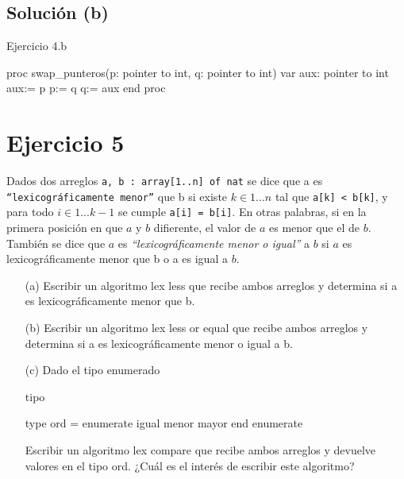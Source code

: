 \subsection{Solución (b)}
\begin{codebox}{Ejercicio 4.b}
\begin{pascallike}
proc swap_punteros(p: pointer to int, q: pointer to int)
var aux: pointer to int
aux:= p
p:= q
q:= aux
end proc
\end{pascallike}    
\end{codebox}

\section{Ejercicio 5}
Dados dos arreglos \texttt{a, b : array[1..n] of nat} se dice que a es \texttt{“lexicográficamente menor”} que b si existe $k \in {1 . . . n}$ tal que \texttt{a[k] < b[k]}, y para todo $i \in {1 . . . k - 1}$ se cumple \texttt{a[i] = b[i]}. En otras palabras, si en la primera posición en que $a$ y $b$ difierente, el valor de $a$ es menor que el de $b$. También se dice que $a$ es \textit{“lexicográficamente menor o igual”} a $b$ si $a$ es lexicográficamente menor que b o a es igual a $b$.

\begin{itemize}
    \item[(a)] Escribir un algoritmo lex less que recibe ambos arreglos y determina si a es lexicográficamente menor que b.
    \item[(b)] Escribir un algoritmo lex less or equal que recibe ambos arreglos y determina si a es lexicográficamente menor o igual a b. 
    \item[(c)] Dado el tipo enumerado
\begin{codebox}{tipo}
\begin{pascallike}
type ord = enumerate
             igual
             menor
             mayor
           end enumerate
\end{pascallike}
\end{codebox}
Escribir un algoritmo lex compare que recibe ambos arreglos y devuelve valores en el tipo ord. ¿Cuál es el interés de escribir este algoritmo?
\end{itemize}

